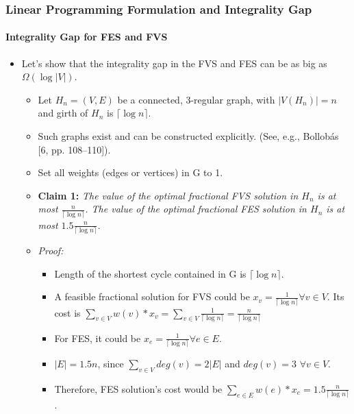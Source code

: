 \documentclass[10pt]{beamer}
\begin{document}
\begin{frame}
    \frametitle{Linear Programming Formulation and Integrality Gap}
    \framesubtitle{Integrality Gap for FES and FVS}

    \begin{itemize}
        \item Let's show that the integrality gap in the FVS and FES can be as big as \(\Omega(\log|V|)\). 
        \begin{itemize}
            \item Let \(H_n = (V,E)\) be a connected, 3-regular graph, with \(|V(H_n)| = n\) and girth of \(H_n\) is \(\lceil \log n \rceil\).
            \item Such graphs exist and can be constructed explicitly. (See, e.g., Bollobás [6, pp. 108–110]).
            \item Set all weights (edges or vertices) in G to 1.
            \item \textbf{Claim 1:} \textit{The value of the optimal fractional FVS solution in \(H_n\) is at most \(\frac{n}{\lceil \log n \rceil }\). The value of the optimal fractional FES solution in \(H_n\) is at most \(1.5\frac{n}{\lceil \log n \rceil}\).}
            \item \textit{Proof:} 
                \begin{itemize} 
                    \item Length of the shortest cycle contained in G is \(\lceil \log n \rceil\).
                    \item A feasible fractional solution for FVS could be \(x_v = \frac{1}{\lceil \log n \rceil} \forall v \in V\). Its cost is \(\displaystyle\sum_{v\in V} w(v) * x_v  = \displaystyle\sum_{v\in V} \frac{1}{\lceil \log n \rceil} = \frac{n}{\lceil \log n \rceil}\)
                    \item For FES, it could be \(x_e = \frac{1}{\lceil \log n \rceil} \forall e \in E\). 
                    \item \(|E| = 1.5n\), since \(\displaystyle\sum_{v\in V} deg(v) = 2|E|\) and \(deg(v) = 3\) \(\forall v \in V\).
                    \item Therefore, FES solution's cost would be
                    \(\displaystyle\sum_{e\in E} w(e) * x_e = 1.5\frac{n}{\lceil \log n \rceil}\).
                \end{itemize}
        \end{itemize}
    \end{itemize}
\end{frame}
\end{document}
